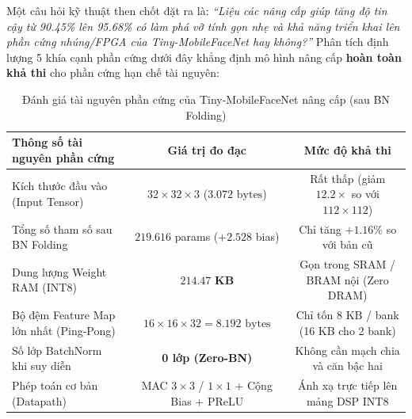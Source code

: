 \documentclass[11pt,a4paper]{article}
\begin{document}
Một câu hỏi kỹ thuật then chốt đặt ra là: \textit{``Liệu các nâng cấp giúp tăng độ tin cậy từ 90.45\% lên 95.68\% có làm phá vỡ tính gọn nhẹ và khả năng triển khai lên phần cứng nhúng/FPGA của Tiny-MobileFaceNet hay không?''} Phân tích định lượng 5 khía cạnh phần cứng dưới đây khẳng định mô hình nâng cấp \textbf{hoàn toàn khả thi} cho phần cứng hạn chế tài nguyên:

\begin{table}[H]
\centering
\caption{Đánh giá tài nguyên phần cứng của Tiny-MobileFaceNet nâng cấp (sau BN Folding)}
\label{tab:hw_feasibility}
\vspace{0.3em}
\begin{tabular}{lcc}
\toprule
\textbf{Thông số tài nguyên phần cứng} & \textbf{Giá trị đo đạc} & \textbf{Mức độ khả thi} \\
\midrule
Kích thước đầu vào (Input Tensor) & $32 \times 32 \times 3$ ($3.072\text{ bytes}$) & Rất thấp (giảm $12.2\times$ so với $112 \times 112$) \\
Tổng số tham số sau BN Folding & $219.616$ params ($+2.528$ bias) & Chỉ tăng $+1.16\%$ so với bản cũ \\
Dung lượng Weight RAM (INT8) & $\mathbf{214.47\text{ KB}}$ & Gọn trong SRAM / BRAM nội (Zero DRAM) \\
Bộ đệm Feature Map lớn nhất (Ping-Pong) & $16 \times 16 \times 32 = 8.192\text{ bytes}$ & Chỉ tốn $8\text{ KB}$ / bank (16 KB cho 2 bank) \\
Số lớp BatchNorm khi suy diễn & \textbf{0 lớp (Zero-BN)} & Không cần mạch chia và căn bậc hai \\
Phép toán cơ bản (Datapath) & MAC $3 \times 3$ / $1 \times 1$ + Cộng Bias + PReLU & Ánh xạ trực tiếp lên mảng DSP INT8 \\
\bottomrule
\end{tabular}
\end{table}
\end{document}
